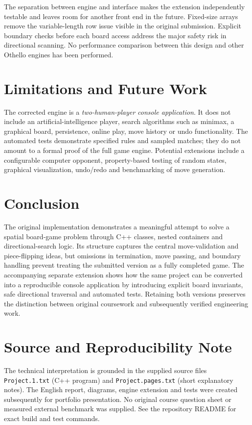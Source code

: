 \documentclass[11pt,a4paper]{article}
\newcommand{\code}[1]{\texttt{#1}}
\begin{document}
The separation between engine and interface makes the extension independently testable and leaves room for another front end in the future. Fixed-size arrays remove the variable-length row issue visible in the original submission. Explicit boundary checks before each board access address the major safety risk in directional scanning. No performance comparison between this design and other Othello engines has been performed.

\section{Limitations and Future Work}
The corrected engine is a \emph{two-human-player console application}. It does not include an artificial-intelligence player, search algorithms such as minimax, a graphical board, persistence, online play, move history or undo functionality. The automated tests demonstrate specified rules and sampled matches; they do not amount to a formal proof of the full game engine. Potential extensions include a configurable computer opponent, property-based testing of random states, graphical visualization, undo/redo and benchmarking of move generation.

\section{Conclusion}
The original implementation demonstrates a meaningful attempt to solve a spatial board-game problem through C++ classes, nested containers and directional-search logic. Its structure captures the central move-validation and piece-flipping ideas, but omissions in termination, move passing, and boundary handling prevent treating the submitted version as a fully completed game. The accompanying separate extension shows how the same project can be converted into a reproducible console application by introducing explicit board invariants, safe directional traversal and automated tests. Retaining both versions preserves the distinction between original coursework and subsequently verified engineering work.

\section*{Source and Reproducibility Note}
The technical interpretation is grounded in the supplied source files \code{Project.1.txt} (C++ program) and \code{Project.pages.txt} (short explanatory notes). The English report, diagrams, engine extension and tests were created subsequently for portfolio presentation. No original course question sheet or measured external benchmark was supplied. See the repository README for exact build and test commands.
\end{document}
